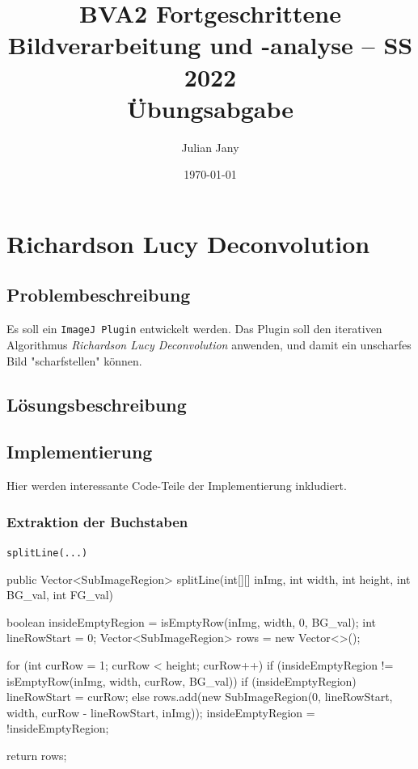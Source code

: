 \documentclass[german,notitlepage,smartquotes]{hgbreport}
\author{Julian Jany}                        %
\title{BVA2 Fortgeschrittene Bildverarbeitung und -analyse -- SS 2022\\ %
				Übungsabgabe \arabic{chapter}}
\date{\today}
\begin{document}
\maketitle



\section{Richardson Lucy Deconvolution}

\subsection{Problembeschreibung}

Es soll ein \texttt{ImageJ Plugin} entwickelt werden. 
Das Plugin soll den iterativen Algorithmus \textit{Richardson Lucy Deconvolution} anwenden, und damit ein \zB unscharfes Bild "scharfstellen" können. 

\subsection{Lösungsbeschreibung}

\subsection{Implementierung}

Hier werden interessante Code-Teile der Implementierung inkludiert.

\subsubsection{Extraktion der Buchstaben}

\begin{program}[h]
\caption{\texttt{splitLine(...)}}
\label{prog:extract-01}
\begin{JavaCode}
public Vector<SubImageRegion> splitLine(int[][] inImg, int width, int height, int BG_val, int FG_val) {
	boolean insideEmptyRegion = isEmptyRow(inImg, width, 0, BG_val);
	int lineRowStart = 0;
	Vector<SubImageRegion> rows = new Vector<>();

	for (int curRow = 1; curRow < height; curRow++) {
		if (insideEmptyRegion != isEmptyRow(inImg, width, curRow, BG_val)) {
			if (insideEmptyRegion) {
				lineRowStart = curRow;
			} else {
				rows.add(new SubImageRegion(0, lineRowStart, width, curRow - lineRowStart, inImg));
			}
			insideEmptyRegion = !insideEmptyRegion;
		}
	}

	return rows;
}
\end{JavaCode}
\end{program}
\end{document}
